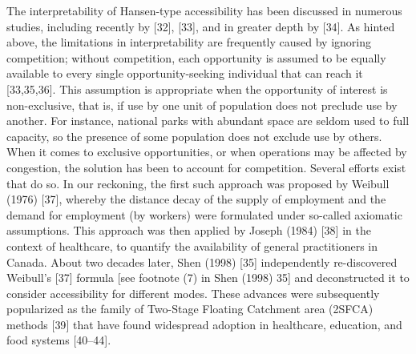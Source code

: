 \documentclass[10pt,letterpaper]{article}
\begin{document}
The interpretability of Hansen-type accessibility has been discussed in
numerous studies, including recently by {[}32{]}, {[}33{]}, and in
greater depth by {[}34{]}. As hinted above, the limitations in
interpretability are frequently caused by ignoring competition; without
competition, each opportunity is assumed to be equally available to
every single opportunity-seeking individual that can reach it
{[}33,35,36{]}. This assumption is appropriate when the opportunity of
interest is non-exclusive, that is, if use by one unit of population
does not preclude use by another. For instance, national parks with
abundant space are seldom used to full capacity, so the presence of some
population does not exclude use by others. When it comes to exclusive
opportunities, or when operations may be affected by congestion, the
solution has been to account for competition. Several efforts exist that
do so. In our reckoning, the first such approach was proposed by Weibull
(1976) {[}37{]}, whereby the distance decay of the supply of employment
and the demand for employment (by workers) were formulated under
so-called axiomatic assumptions. This approach was then applied by
Joseph (1984) {[}38{]} in the context of healthcare, to quantify the
availability of general practitioners in Canada. About two decades
later, Shen (1998) {[}35{]} independently re-discovered Weibull's
{[}37{]} formula {[}see footnote (7) in Shen (1998) 35{]} and
deconstructed it to consider accessibility for different modes. These
advances were subsequently popularized as the family of Two-Stage
Floating Catchment area (2SFCA) methods {[}39{]} that have found
widespread adoption in healthcare, education, and food systems
{[}40--44{]}.
\end{document}
